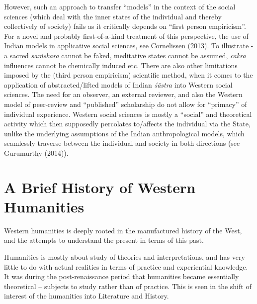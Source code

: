 However, such an approach to transfer ``models'' in the context of the social sciences (which deal with the inner states of the individual and thereby collectively of society) fails as it critically depends on ``first person empiricism''. For a novel and probably first-of-a-kind treatment of this perspective, the use of Indian models in applicative social sciences, see Cornelissen (2013). To illustrate - a sacred {\sl saṁskāra} cannot be faked, meditative states cannot be assumed, {\sl cakra} influences cannot be chemically induced etc. There are also other limitations imposed by the (third person empiricism) scientific method, when it comes to the application of abstracted/lifted models of Indian {\sl śāstra} into Western social sciences. The need for an observer, an external reviewer, and also the Western model of peer-review and ``published'' scholarship do not allow for ``primacy'' of individual experience. Western social sciences is mostly a ``social'' and theoretical activity which then supposedly percolates to/affects the individual via the State, unlike the underlying assumptions of the Indian anthropological models, which seamlessly traverse between the individual and society in both directions (see Gurumurthy (2014)).

\section*{A Brief History of Western Humanities}

Western humanities is deeply rooted in the manufactured history of the West, and the attempts to understand the present in terms of this past.

Humanities is mostly about study of theories and interpretations, and has very little to do with actual realities in terms of practice and experiential knowledge. It was during the post-renaissance period that  humanities became essentially theoretical -- subjects to study rather than of practice. This is seen in the shift of interest of the humanities into Literature and History.

